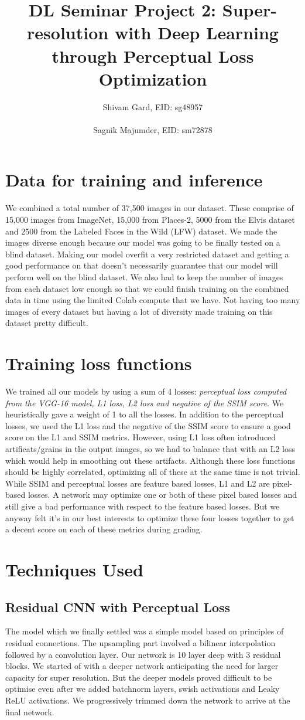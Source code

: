 \documentclass[11pt,a4paper]{article}
\title{DL Seminar Project 2: Super-resolution with Deep Learning through Perceptual Loss Optimization}
\author{
   Shivam Gard, EID: sg48957 \\
 \\\And
 Sagnik Majumder, EID: sm72878 }
\date{}
\begin{document}
\maketitle
\section{Data for training and inference}
We combined a total number of 37,500 images in our dataset. These comprise of 15,000 images from ImageNet, 15,000 from Places-2, 5000 from the Elvis dataset and 2500 from the Labeled Faces in the Wild (LFW) dataset. We made the images diverse enough because our model was going to be finally tested on a blind dataset. Making our model overfit a very restricted dataset and getting a good performance on that doesn't necessarily guarantee that our model will perform well on the blind dataset. We also had to keep the number of images from each dataset low enough so that we could finish training on the combined data in time using the limited Colab compute that we have. Not having too many images of every dataset but having a lot of diversity made training on this dataset pretty difficult.
\section{Training loss functions}
We trained all our models by using a sum of 4 losses: \textit{perceptual loss computed from the VGG-16 model, L1 loss, L2 loss and negative of the SSIM score}. We heuristically gave a weight of 1 to all the losses. In addition to the perceptual losses, we used the L1 loss and the negative of the SSIM score to ensure a good score on the L1 and SSIM metrics. However, using L1 loss often introduced artificats/grains in the output images, so we had to balance that with an L2 loss which would help in smoothing out these artifacts. Although these loss functions should be highly correlated, optimizing all of these at the same time is not trivial. While SSIM and perceptual losses are feature based losses, L1 and L2 are pixel-based losses. A network may optimize one or both of these pixel based losses and still give a bad performance with respect to the feature based losses. But we anyway felt it's in our best interests to optimize these four losses together to get a decent score on each of these metrics during grading.
\section{Techniques Used}
\subsection{Residual CNN with Perceptual Loss}
The model which we finally settled was a simple model based on principles of residual connections. The upsampling part involved a bilinear interpolation followed by a convolution layer. Our network is 10 layer deep with 3 residual blocks. We started of with a deeper network anticipating the need for larger capacity for super resolution. But the deeper models proved difficult to be optimise even after we added batchnorm layers, swish activations and Leaky ReLU activations. We progressively trimmed down the network to arrive at the final network.
\end{document}
